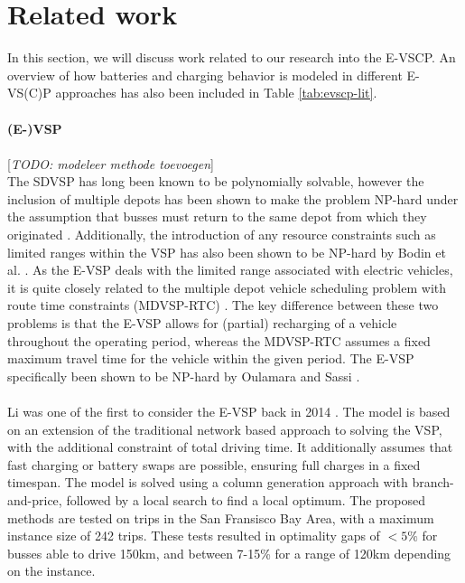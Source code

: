 \documentclass[ht]{article}
\newcommand{\todo}[1]{{\color{red}[\textit{TODO: #1}]}}
\begin{document}
\section{Related work}
In this section, we will discuss work related to our research into the E-VSCP.
An overview of how batteries and charging behavior is modeled in different
E-VS(C)P approaches has also been included in Table \ref{tab:evscp-lit}. \\\\
\noindent \textbf{(E-)VSP} \\\\ \todo{modeleer methode toevoegen}\\ The SDVSP
has long been known to be polynomially solvable, however the inclusion of
multiple depots has been shown to make the problem NP-hard under the assumption
that busses must return to the same depot from which they originated
\cite{Bunte2009}. Additionally, the introduction of any resource constraints
such as limited ranges within the VSP has also been
shown to be NP-hard by Bodin et al. \cite{Bodin1983}. As the E-VSP deals with
the limited range associated with electric vehicles, it is quite closely
related to the multiple depot vehicle scheduling problem with route time
constraints (MDVSP-RTC) \cite{Haghani2002}. The key difference between these
two problems is that the E-VSP allows for (partial) recharging of a vehicle
throughout the operating period, whereas the MDVSP-RTC assumes a fixed maximum
travel time for the vehicle within the given period. The E-VSP specifically
been shown to be NP-hard by Oulamara and Sassi \cite{Sassi2014}. \\\\

Li was one of the first to consider the E-VSP back in 2014 \cite{Li2014}. The
model is based on an extension of the traditional network based approach to
solving the VSP, with the additional constraint of total driving time. It
additionally assumes that fast charging or battery swaps are possible, ensuring
full charges in a fixed timespan. The model is solved using a column generation
approach with branch-and-price, followed by a local search to find a local
optimum. The proposed methods are tested on trips in the San Fransisco Bay Area, with a
maximum instance size of 242 trips. These tests resulted in optimality gaps of
$<5\%$ for busses able to drive 150km, and between 7-15\% for a range of 120km
depending on the instance. \\\\
\end{document}
